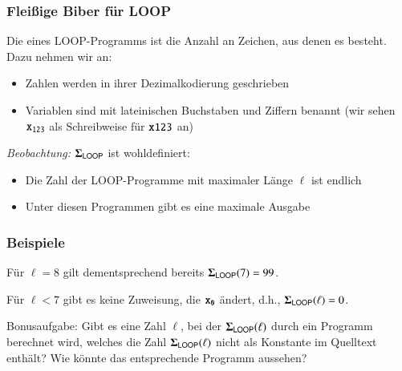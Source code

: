 \documentclass[onlymath]{beamer}
\begin{document}
\begin{frame}\frametitle{Fleißige Biber für LOOP}

Die  eines LOOP-Programms ist die Anzahl an
Zeichen, aus denen es besteht. Dazu nehmen wir an:
\begin{itemize}
\item Zahlen werden in ihrer Dezimalkodierung geschrieben
\item Variablen sind mit lateinischen Buchstaben und Ziffern benannt (wir sehen $\texttt{x}_{\texttt{123}}$ als Schreibweise für $\texttt{x123}$ an)
\end{itemize}\bigskip\pause

\pause

\emph{Beobachtung:} $\boldsymbol{\Sigma}_{\textsf{LOOP}}$ ist wohldefiniert:
\begin{itemize}
\item Die Zahl der LOOP-Programme mit maximaler Länge $\ell$ ist endlich
\item Unter diesen Programmen gibt es eine maximale Ausgabe
\end{itemize}

\end{frame}

\begin{frame}\frametitle{Beispiele}

\medskip\pause

Für $\ell=8$ gilt dementsprechend bereits $\boldsymbol{\Sigma}_{\textsf{LOOP}}(7)=99$.
\medskip

Für $\ell<7$ gibt es keine Zuweisung, die $\texttt{x}_{\texttt{0}}$ ändert, d.h., $\boldsymbol{\Sigma}_{\textsf{LOOP}}(\ell)=0$.
\bigskip\pause

\alert{Bonusaufgabe:} Gibt es eine Zahl $\ell$, bei der $\boldsymbol{\Sigma}_{\textsf{LOOP}}(\ell)$ durch ein
Programm berechnet wird, welches die Zahl $\boldsymbol{\Sigma}_{\textsf{LOOP}}(\ell)$ nicht
als Konstante im Quelltext enthält? Wie könnte das entsprechende Programm aussehen?


\end{frame}
\end{document}
